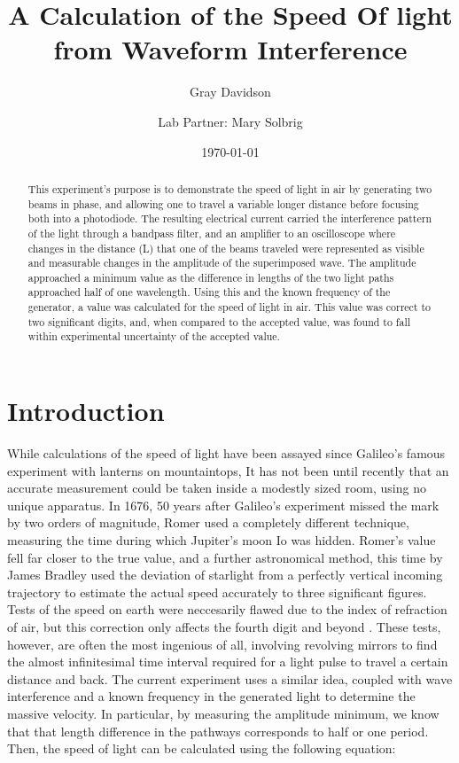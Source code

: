 \documentclass[aps,pre,twocolumn,nofootinbib]{revtex4}
\begin{document}
\title{A Calculation of the Speed Of light from Waveform Interference}

\author{Gray Davidson}
\author{Lab Partner: Mary Solbrig}

\date{\today}

\begin{abstract}  
This experiment's purpose is to demonstrate the speed of light in air by generating two beams in phase, and allowing one to travel a variable longer distance before focusing both into a photodiode.  The resulting electrical current carried the interference pattern of the light through a bandpass filter, and an amplifier to an oscilloscope where changes in the distance (L) that one of the beams traveled were represented as visible and measurable changes in the amplitude of the superimposed wave.  The amplitude approached a minimum value as the difference in lengths of the two light paths approached half of one wavelength.  Using this and the known frequency of the generator, a value was calculated for the speed of light in air.  This value was correct to two significant digits, and, when compared to the accepted value, was found to fall within experimental uncertainty of the accepted value.  
\end{abstract}
\maketitle

\section{Introduction}
While calculations of the speed of light have been assayed since Galileo's famous experiment with lanterns on mountaintops, It has not been until recently that an accurate measurement could be taken inside a modestly sized room, using no unique apparatus.  In 1676, 50 years after Galileo's experiment missed the mark by two orders of magnitude, Romer used a completely different technique, measuring the time during which Jupiter's moon Io was hidden. \cite{Scribner2008} Romer's value fell far closer to the true value, and a further astronomical method, this time by James Bradley used the deviation of starlight from a perfectly vertical incoming trajectory to estimate the actual speed accurately to three significant figures.  \cite{Scribner2008}  Tests of the speed on earth were neccesarily flawed due to the index of refraction of air, but this correction only affects the fourth digit and beyond  \cite{constant}.  These tests, however, are often the most ingenious of all, involving revolving mirrors to find the almost infinitesimal time interval required for a light pulse to travel a certain distance and back.  The current experiment uses a similar idea, coupled with wave interference and a known frequency in the generated light to determine the massive velocity.  In particular, by measuring the amplitude minimum, we know that that length difference in the pathways corresponds to half or one period.  Then, the speed of light can be calculated using the following equation: 
\end{document}
